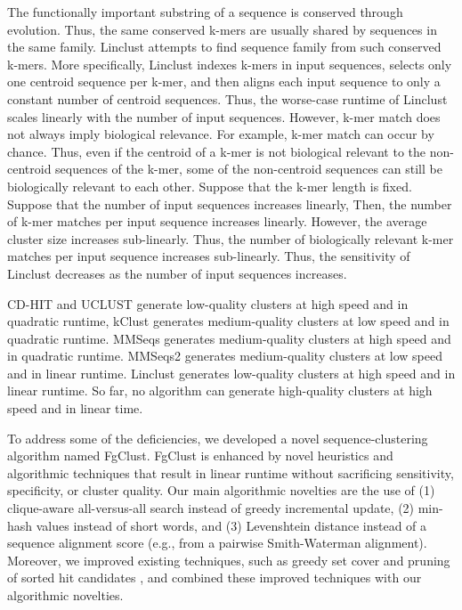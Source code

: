 \documentclass[11pt,letterpaper]{article}
\begin{document}
The functionally important substring of a sequence is conserved through evolution.
Thus, the same conserved k-mers are usually shared by sequences in the same family.
Linclust attempts to find sequence family from such conserved k-mers.
More specifically, 
	Linclust indexes k-mers in input sequences, 
	selects only one centroid sequence per k-mer,
	and then aligns each input sequence to only a constant number of centroid sequences.
Thus, the worse-case runtime of Linclust scales linearly with the number of input sequences.
However, k-mer match does not always imply biological relevance.
For example, k-mer match can occur by chance.
Thus, 
	even if the centroid of a k-mer is not biological relevant to the non-centroid sequences of the k-mer, 
	some of the non-centroid sequences can still be biologically relevant to each other.
Suppose that the k-mer length is fixed.
Suppose that the number of input sequences increases linearly,
Then, 
	the number of k-mer matches per input sequence increases linearly.
However,
	the average cluster size increases sub-linearly.
Thus, the number of biologically relevant k-mer matches per input sequence increases sub-linearly.
Thus, the sensitivity of Linclust decreases as the number of input sequences increases.


CD-HIT and UCLUST   
         generate  low-quality    clusters at high   speed and in quadratic runtime,
kClust   generates medium-quality clusters at low    speed and in quadratic runtime.
MMSeqs   generates medium-quality clusters at high   speed and in quadratic runtime.
MMSeqs2  generates medium-quality clusters at low    speed and in linear    runtime.
Linclust generates low-quality    clusters at high   speed and in linear    runtime.
So far, 
	no algorithm can
         generate  high-quality   clusters at high   speed and in linear time.

To address some of the deficiencies, we developed a novel sequence-clustering algorithm named FgClust.
FgClust is enhanced by novel heuristics and algorithmic techniques that result in linear runtime without sacrificing sensitivity, specificity, or cluster quality. Our main algorithmic novelties are the use of (1) clique-aware all-versus-all search instead of greedy incremental update, (2) min-hash values instead of short words, and (3) Levenshtein distance instead of a sequence alignment score (e.g., from a pairwise Smith-Waterman alignment). Moreover, we improved existing techniques, such as greedy set cover \cite{steinegger2017mmseqs2} and pruning of sorted hit candidates \cite{edgar2010search}, and combined these improved techniques with our algorithmic novelties.
\end{document}
